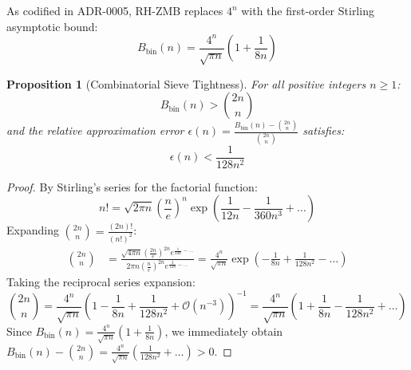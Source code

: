 \documentclass[11pt,a4paper]{article}
\newtheorem{proposition}[theorem]{Proposition}
\theoremstyle{definition}
\theoremstyle{remark}
\begin{document}
As codified in ADR-0005, RH-ZMB replaces $4^n$ with the first-order Stirling asymptotic bound:
\begin{equation}
B_{\mathrm{bin}}(n) = \frac{4^n}{\sqrt{\pi n}}\left(1 + \frac{1}{8n}\right)
\end{equation}

\begin{proposition}[Combinatorial Sieve Tightness]
For all positive integers $n \ge 1$:
\begin{equation}
B_{\mathrm{bin}}(n) > \binom{2n}{n}
\end{equation}
and the relative approximation error $\epsilon(n) = \frac{B_{\mathrm{bin}}(n) - \binom{2n}{n}}{\binom{2n}{n}}$ satisfies:
\begin{equation}
\epsilon(n) < \frac{1}{128 n^2}
\end{equation}
\end{proposition}

\begin{proof}
By Stirling's series for the factorial function:
\begin{equation}
n! = \sqrt{2\pi n}\left(\frac{n}{e}\right)^n \exp\left(\frac{1}{12n} - \frac{1}{360n^3} + \dots\right)
\end{equation}
Expanding $\binom{2n}{n} = \frac{(2n)!}{(n!)^2}$:
\begin{align}
\binom{2n}{n} &= \frac{\sqrt{4\pi n}\left(\frac{2n}{e}\right)^{2n} e^{\frac{1}{24n} - \dots}}{2\pi n\left(\frac{n}{e}\right)^{2n} e^{\frac{2}{12n} - \dots}} = \frac{4^n}{\sqrt{\pi n}} \exp\left(-\frac{1}{8n} + \frac{1}{128n^2} - \dots\right)
\end{align}
Taking the reciprocal series expansion:
\begin{equation}
\binom{2n}{n} = \frac{4^n}{\sqrt{\pi n}}\left(1 - \frac{1}{8n} + \frac{1}{128n^2} + \mathcal{O}(n^{-3})\right)^{-1} = \frac{4^n}{\sqrt{\pi n}}\left(1 + \frac{1}{8n} - \frac{1}{128n^2} + \dots\right)
\end{equation}
Since $B_{\mathrm{bin}}(n) = \frac{4^n}{\sqrt{\pi n}}(1 + \frac{1}{8n})$, we immediately obtain $B_{\mathrm{bin}}(n) - \binom{2n}{n} = \frac{4^n}{\sqrt{\pi n}}(\frac{1}{128n^2} + \dots) > 0$.
\end{proof}
\end{document}
